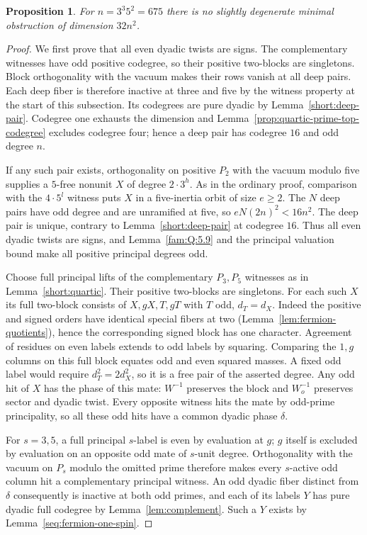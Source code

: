 \documentclass[11pt,a4paper]{article}
\numberwithin{equation}{section}
\newtheorem{proposition}[theorem]{Proposition}
\theoremstyle{remark}
\begin{document}
\begin{proposition}\label{short:fermionic-dyadic-quintic}
For $n=3^3 5^2=675$ there is no slightly degenerate minimal obstruction of dimension $32n^2$.
\end{proposition}
\begin{proof}
We first prove that all even dyadic twists are signs. The
complementary witnesses have odd positive codegree, so their
positive two-blocks are singletons. Block orthogonality with the
vacuum makes their rows vanish at all deep pairs. Each deep fiber
is therefore inactive at three and five by the witness property at
the start of this subsection. Its codegrees are pure dyadic by
Lemma~\ref{short:deep-pair}. Codegree one exhausts the dimension
and Lemma~\ref{prop:quartic-prime-top-codegree} excludes codegree
four; hence a deep pair has codegree $16$ and odd degree $n$.

If any such pair exists, orthogonality on positive $P_2$ with the
vacuum modulo five supplies a $5$-free nonunit $X$ of degree
$2\cdot3^h$. As in the ordinary proof, comparison with the
$4\cdot5^l$ witness puts $X$ in a five-inertia orbit of size
$e\ge2$. The $N$ deep pairs have odd degree and are
unramified at five, so $eN(2n)^2<16n^2$. The deep pair is unique,
contrary to Lemma~\ref{short:deep-pair} at codegree $16$. Thus
all even dyadic twists are signs, and Lemma~\ref{fam:Q:5.9}
and the principal valuation bound make all positive principal degrees odd.

Choose full principal lifts of the complementary $P_3,P_5$
witnesses as in Lemma~\ref{short:quartic}. Their positive
two-blocks are singletons. For each such $X$ its full two-block
consists of $X,gX,T,gT$ with $T$ odd, $d_T=d_X$. Indeed the
positive and signed orders have identical special fibers at two
(Lemma~\ref{lem:fermion-quotients}), hence the corresponding
signed block has one character. Agreement of residues on even
labels extends to odd labels by squaring. Comparing the $1,g$
columns on this full block equates odd and even squared masses.
A fixed odd label would require $d_T^2=2d_X^2$, so it is a free pair
of the asserted degree. Any odd hit of $X$ has the phase of this
mate: $W^{-1}$ preserves the block and $W_o^{-1}$ preserves sector
and dyadic twist. Every opposite witness hits the mate by odd-prime
principality, so all these odd hits have a common dyadic phase
$\delta$.

For $s=3,5$, a full principal $s$-label is even by evaluation
at $g$; $g$ itself is excluded by evaluation on an opposite odd
mate of $s$-unit degree. Orthogonality with the vacuum on $P_s$
modulo the omitted prime therefore makes every $s$-active odd
column hit a complementary principal witness. An odd dyadic
fiber distinct from $\delta$ consequently is inactive at both
odd primes, and each of its labels $Y$ has pure dyadic full
codegree by Lemma~\ref{lem:complement}. Such a $Y$ exists by
Lemma~\ref{seq:fermion-one-spin}.


\end{proof}
\end{document}
